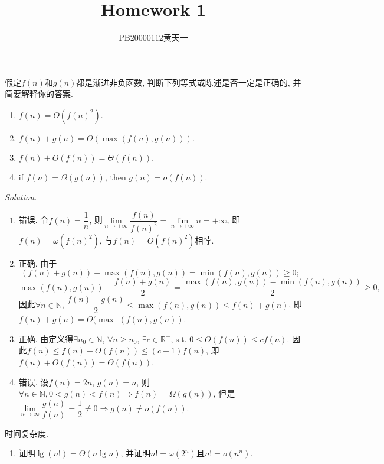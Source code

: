 \documentclass[10pt]{article}
\title{Homework 1}
\author{PB20000112\quad 黄天一}
\date{}
\newcommand{\mb}[1]{\mathbb{#1}}
\begin{document}
	\maketitle
	\begin{enumerate}
		\begin{tcolorbox}[colback = red!20!white]
			\textit{Solution.}\ 
			\begin{enumerate}
				\item 错误. 令$f(n)=\dfrac{1}{n}$, 则$\lim\limits_{n\to+\infty}\dfrac{f(n)}{f(n)^2}=\lim\limits_{n\to+\infty}n=+\infty$, 即$f(n)=\omega(f(n)^2)$, 与$f(n)=O(f(n)^2)$相悖.
				\item 正确. 由于
				$$(f(n)+g(n))-\max(f(n),g(n))=\min(f(n),g(n))\geqslant 0;$$
				$$\max(f(n),g(n))-\dfrac{f(n)+g(n)}{2}=\dfrac{\max(f(n),g(n))-\min(f(n),g(n))}{2}\geqslant 0,$$
				因此$\forall n\in\mb{N}$, $\dfrac{f(n)+g(n)}{2}\leqslant\max(f(n),g(n))\leqslant f(n)+g(n)$, 即$f(n)+g(n)=\Theta(\max$ $(f(n),g(n))$.
				\item 正确. 由定义得$\exists n_0\in\mb{N}$, $\forall n\geqslant n_0$, $\exists c\in\mb{R}^+$, s.t. $0\leqslant O(f(n))\leqslant cf(n)$. 因此$f(n)\leqslant f(n)+O(f(n))\leqslant (c+1)f(n)$, 即$f(n)+O(f(n))=\Theta(f(n))$.
				\item 错误. 设$f(n)=2n$, $g(n)=n$, 则$\forall n\in\mb{N},0<g(n)<f(n)\Rightarrow f(n)=\Omega(g(n))$, 但是$\lim\limits_{n\to\infty}\dfrac{g(n)}{f(n)}=\dfrac{1}{2}\neq 0\Rightarrow g(n)\neq o(f(n))$.
			\end{enumerate}
		\end{tcolorbox}
\end{enumerate}
\end{document}
